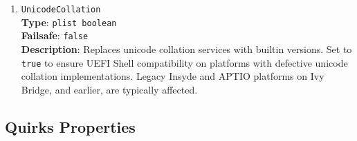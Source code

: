 \documentclass[]{article}
\begin{document}
\begin{enumerate}
\item
  \texttt{UnicodeCollation}\\
  \textbf{Type}: \texttt{plist\ boolean}\\
  \textbf{Failsafe}: \texttt{false}\\
  \textbf{Description}: Replaces unicode collation services with builtin
  versions. Set to \texttt{true} to ensure UEFI Shell compatibility on platforms
  with defective unicode collation implementations. Legacy Insyde and APTIO platforms
  on Ivy Bridge, and earlier, are typically affected.

\end{enumerate}

\subsection{Quirks Properties}\label{uefiquirkprops}
\end{document}
